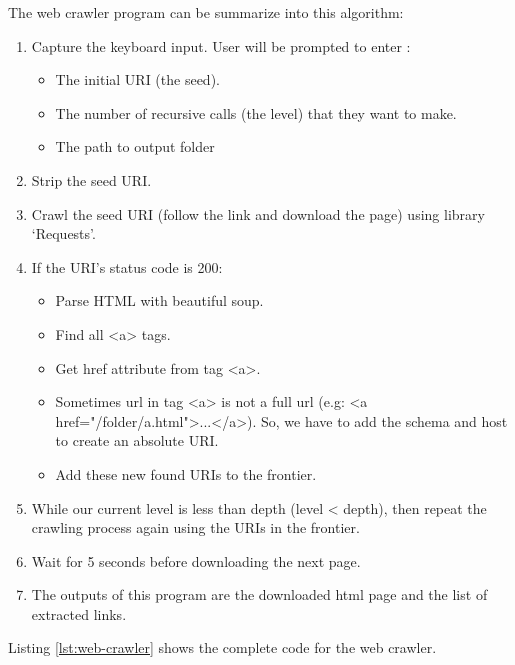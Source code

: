 \documentclass[letterpaper,11pt]{article}
\begin{document}
The web crawler program can be summarize into this algorithm:
\begin{enumerate}
	\item Capture the keyboard input. User will be prompted to enter :
		\begin{itemize}
			\item The initial URI (the seed).
			\item The number of recursive calls (the level) that they want to make.
			\item The path to output folder
		\end{itemize}
	\item Strip the seed URI.
	\item Crawl the seed URI (follow the link and download the page) using library `Requests'.
	\item If the URI's status code is 200:
		\begin{itemize}
			\item Parse HTML with beautiful soup.
			\item Find all <a> tags.
			\item Get href attribute from tag <a>. 
			\item Sometimes url in tag <a> is not a full url (e.g: <a href="/folder/a.html">...</a>). So, we have to add the schema and host to create an absolute URI. 
			\item Add these new found URIs to the frontier.
		\end{itemize}  
	\item While our current level is less than depth (level < depth), then repeat the crawling process again using the URIs in the frontier. 
	\item Wait for 5 seconds before downloading the next page. 
	\item The outputs of this program are the downloaded html page and the list of extracted links. 
\end{enumerate}

Listing \ref{lst:web-crawler} shows the complete code for the web crawler. 
\end{document}

